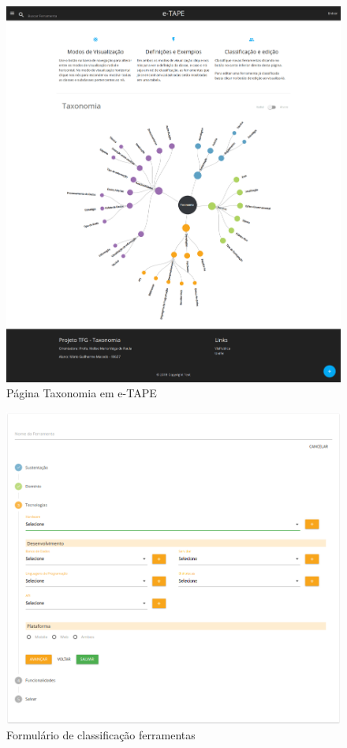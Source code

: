 \begin{figure}[!ht]
    \centering
    \includegraphics[scale=0.15]{./figuras/pagina-taxonomia.png}
    \caption{Página Taxonomia em e-TAPE }
    \label{fig:pag-taxonomia}
\end{figure}
\pagebreak

\begin{figure}[!ht]
    \centering
    \includegraphics[scale=0.30]{./figuras/new-ferramenta.png}
    \caption{Formulário de classificação ferramentas}
    \label{fig:new-ferramenta}
\end{figure}


